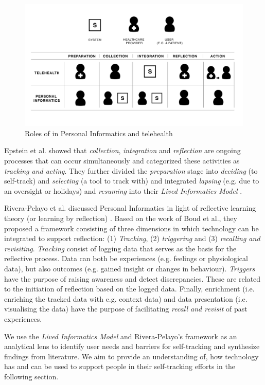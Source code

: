 \begin{figure}[!h]
\centering
\includegraphics[width=0.9\columnwidth]{img/StakeholdersModel}
\caption{Roles of in Personal Informatics and telehealth}
\label{fig:StakeholdersModel}
\end{figure}

Epstein et al. showed that \textit{collection}, \textit{integration} and \textit{reflection} are ongoing processes that can occur simultaneously and categorized these activities as \textit{tracking and acting}. They further divided the \textit{preparation} stage into \textit{deciding} (to self-track) and \textit{selecting} (a tool to track with) and integrated \textit{lapsing} (e.g. due to an oversight or holidays) and \textit{resuming} into their \textit{Lived Informatics Model} \cite{Epstein2015, Rooksby2014}. 

Rivera-Pelayo et al. discussed Personal Informatics in light of reflective learning theory (or learning by reflection) \cite{Rivera}. Based on the work of Boud et al., they proposed a framework consisting of three dimensions in which technology can be integrated to support reflection: (1) \textit{Tracking}, (2) \textit{triggering} and (3) \textit{recalling and revisiting}. \textit{Tracking} consist of logging data that serves as the basis for the reflective process. Data can both be experiences (e.g. feelings or physiological data), but also outcomes (e.g. gained insight or changes in behaviour). \textit{Triggers} have the purpose of raising awareness and detect discrepancies. These are related to the initiation of reflection based on the logged data. Finally, enrichment (i.e. enriching the tracked data with e.g. context data) and data presentation (i.e. visualising the data) have the purpose of facilitating \textit{recall and revisit} of past experiences. 

We use the \textit{Lived Informatics Model} \cite{Epstein2015} and Rivera-Pelayo’s framework as an analytical lens to identify user needs and barriers for self-tracking and synthesize findings from literature. We aim to provide an understanding of, how technology has and can be used to support people in their self-tracking efforts in the following section. 

